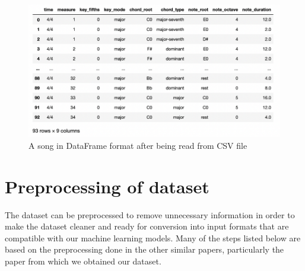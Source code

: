 \begin{figure}
\centering
\includegraphics{Figures/CSV dataframe}
\decoRule
\caption{A song in DataFrame format after being read from CSV file}
\label{fig:CSV_DF}
\end{figure}

\section{Preprocessing of dataset}

The dataset can be preprocessed to remove unnecessary information in order to make the dataset cleaner and ready for conversion into input formats that are compatible with our machine learning models. Many of the steps listed below are based on the preprocessing done in the other similar papers, particularly the paper \cite{BLSTM} from which we obtained our dataset.

